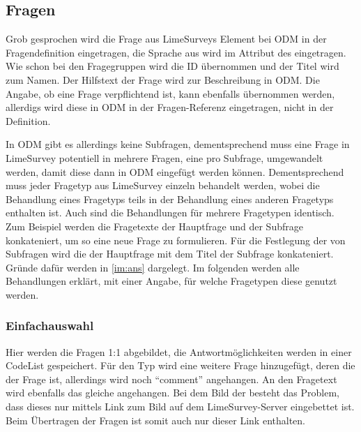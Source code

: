 \subsection{Fragen}


Grob gesprochen wird die Frage aus LimeSurveys  Element bei ODM in  der Fragendefinition eingetragen, die Sprache aus  wird im Attribut  des  eingetragen.
Wie schon bei den Fragegruppen wird die ID übernommen und der Titel wird zum Namen.
Der Hilfstext der Frage wird zur Beschreibung in ODM.
Die Angabe, ob eine Frage verpflichtend ist, kann ebenfalls übernommen werden, allerdigs wird diese in ODM in der Fragen-Referenz eingetragen, nicht in der Definition.

In ODM gibt es allerdings keine Subfragen, dementsprechend muss eine Frage in LimeSurvey potentiell in mehrere Fragen, eine pro Subfrage, umgewandelt werden, damit diese dann in ODM eingefügt werden können.
Dementsprechend muss jeder Fragetyp aus LimeSurvey einzeln behandelt werden, wobei die Behandlung eines Fragetyps teils in der Behandlung eines anderen Fragetyps enthalten ist.
Auch sind die Behandlungen für mehrere Fragetypen identisch.
Zum Beispiel werden die Fragetexte der Hauptfrage und der Subfrage konkateniert, um so eine neue Frage  zu formulieren.
Für die Festlegung der  von Subfragen wird die  der Hauptfrage mit dem Titel der Subfrage konkateniert.
Gründe dafür werden in \cref{im:ans} dargelegt.
Im folgenden werden alle Behandlungen erklärt, mit einer Angabe, für welche Fragetypen diese genutzt werden.

\subsubsection{Einfachauswahl}
\label{e:sc}

Hier werden die Fragen 1:1 abgebildet, die Antwortmöglichkeiten werden in einer CodeList gespeichert.
Für den Typ  wird eine weitere Frage hinzugefügt, deren  die  der Frage ist, allerdings wird noch \enquote{comment} angehangen.
An den Fragetext wird ebenfalls das gleiche angehangen.
Bei dem Bild der  besteht das Problem, dass dieses nur mittels Link zum Bild auf dem LimeSurvey-Server eingebettet ist.
Beim Übertragen der Fragen ist somit auch nur dieser Link enthalten.

